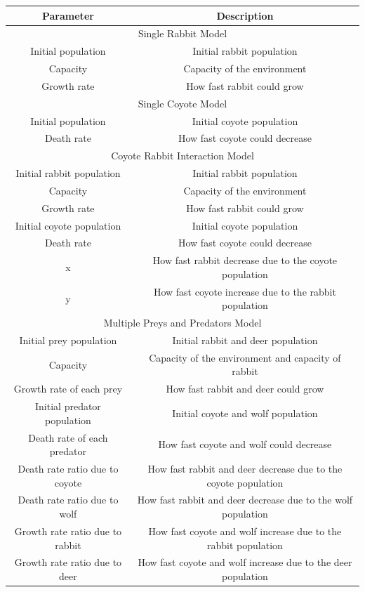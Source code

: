 \documentclass{article}
\begin{document}
\begin{normalsize}
	\begin{center}
		\begin{tabular}{ |c|c|} 
			\hline
			Parameter & Description  \\ 
			\hline
			\multicolumn{2}{|c|}{Single Rabbit Model} \\
			\hline
			Initial population & Initial rabbit population \\ 
			Capacity & Capacity of the environment\\ 
			Growth rate & How fast rabbit could grow \\ 
			\hline
			\multicolumn{2}{|c|}{Single Coyote Model} \\
			\hline
			Initial population & Initial coyote population \\ 
			Death rate & How fast coyote could decrease \\ 
			\hline
			\multicolumn{2}{|c|}{Coyote Rabbit Interaction Model} \\
			\hline
			Initial rabbit population & Initial rabbit population  \\ 
			Capacity & Capacity of the environment\\ 
			Growth rate & How fast rabbit could grow \\ 
			Initial coyote population & Initial coyote population \\ 
			Death rate & How fast coyote could decrease \\ 
			x & How fast rabbit decrease due to the coyote population \\
			y & How fast coyote increase due to the rabbit population \\
			\hline
			\multicolumn{2}{|c|}{Multiple Preys and Predators Model} \\
			\hline
			Initial prey population & Initial rabbit and deer population \\ 
			Capacity & Capacity of the environment and capacity of rabbit\\ 
			Growth rate of each prey & How fast rabbit and deer could grow \\ 
			Initial predator population & Initial coyote and wolf population \\ 
			Death rate of each predator & How fast coyote and wolf could decrease \\ 
			Death rate ratio due to coyote & How fast rabbit and deer decrease due to the coyote population \\
			Death rate ratio due to wolf & How fast rabbit and deer decrease due to the wolf population \\			
			Growth rate ratio due to rabbit & How fast coyote and wolf increase due to the rabbit population\\
			Growth rate ratio due to deer & How fast coyote and wolf increase due to the deer population\\
			\hline
		\end{tabular}
	\end{center}


\end{normalsize}
\end{document}
